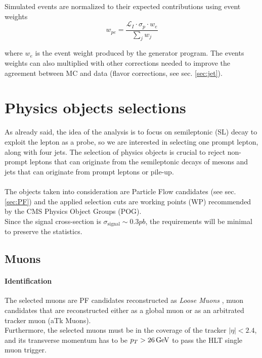 Simulated events are normalized to
their expected contributions using event weights 
\begin{equation}
    w_{pe}=\frac{\mathcal{L}_I \cdot \sigma_p \cdot w_{e} }{\sum_j w_{j}}
\end{equation}

where $w_{e}$ is the event weight produced by the generator program. The events weights can also multiplied with other corrections needed to improve the agreement between MC and data (\eg flavor corrections, see sec. \ref{sec:jet}).

\section{Physics objects selections}
As already said, the idea of the analysis is to focus on semileptonic (SL) decay to exploit the lepton as a probe, so we are interested in selecting one prompt lepton, along with four jets.
The selection of physics objects is crucial to reject non-prompt leptons that can originate from the semileptonic decays of mesons and jets that can originate from prompt leptons or pile-up.\\
\\
The objects taken into consideration are Particle Flow candidates (see sec. \ref{sec:PF}) and the applied selection cuts are working points (WP) recommended by the CMS Physics Object Groups (POG).\\
Since the signal cross-section is $\sigma_{\text{signal}}\sim 0.3 pb$, the requirements will be minimal to preserve the statistics. 
\subsection{Muons}
\paragraph*{Identification}
The selected muons are PF candidates reconstructed as \emph{Loose Muons} \cite{2018MuonData}, \ie muon candidates that are reconstructed either as a global muon or as an arbitrated tracker muon (aTk Muons)\footnotemark.\\
Furthermore, the selected muons must be in the coverage of the tracker $|\eta|<2.4$, and its transverse momentum has to be $p_T>26{\,\text{Ge\hspace{-.08em}V}}$ to pass the HLT single muon trigger.

